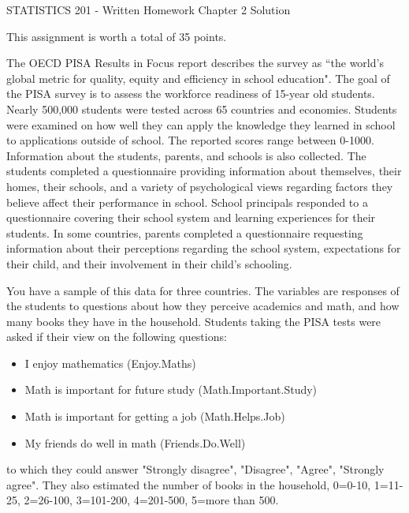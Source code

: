 \documentclass{article}
\begin{document}
\begin{center}
{\Large STATISTICS 201 - Written Homework Chapter 2 Solution}\\[3mm]
\end{center}

\noindent 
This assignment is worth a total of 35 points.

\noindent
The OECD PISA Results in Focus report describes the survey as ``the world's global metric for quality, equity and efficiency in school education". The goal of the PISA survey is to assess the workforce readiness of 15-year old students. Nearly 500,000 students were tested across 65 countries and economies. Students were examined on how well they can apply the knowledge they learned in school to applications outside of school. The  reported scores range between 0-1000. Information about the students, parents, and schools is also collected. The students completed a questionnaire providing information about themselves, their homes, their schools, and a variety of psychological views regarding factors they believe affect their performance in school. School principals responded to a questionnaire covering their school system and learning experiences for their students. In some countries, parents completed a questionnaire requesting information about their perceptions regarding the school system, expectations for their child, and their involvement in their child's schooling. 

You have a sample of this data for three countries. The variables are responses of the students to questions about how they perceive academics and math, and how many books they have in the household. Students taking the PISA tests were asked if their view on the following questions:

\begin{itemize} \itemsep 0in
\item I enjoy mathematics (Enjoy.Maths)
\item Math is important for future study (Math.Important.Study)
\item Math is important for getting a job (Math.Helps.Job)
\item My friends do well in math (Friends.Do.Well)
\end{itemize}

to which they could answer "Strongly disagree", "Disagree", "Agree", "Strongly agree". They also estimated the number of books in the household, 0=0-10, 1=11-25, 2=26-100, 3=101-200, 4=201-500, 5=more than 500.
\end{document}
